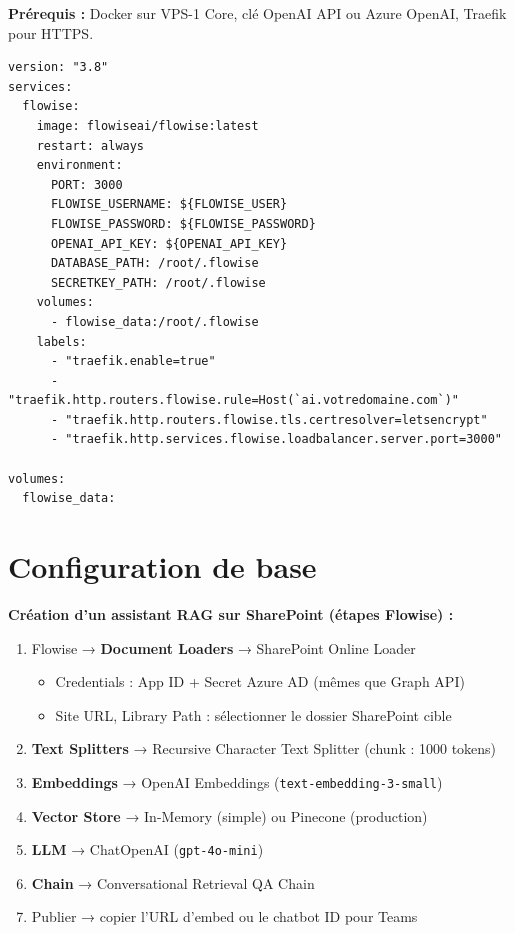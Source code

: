 \documentclass[11pt, a4paper]{article}
\begin{document}
\textbf{Prérequis :} Docker sur VPS-1 Core, clé OpenAI API ou Azure OpenAI, Traefik pour HTTPS.

\begin{lstlisting}[style=yamlstyle, caption={docker-compose.yml — Flowise}]
version: "3.8"
services:
  flowise:
    image: flowiseai/flowise:latest
    restart: always
    environment:
      PORT: 3000
      FLOWISE_USERNAME: ${FLOWISE_USER}
      FLOWISE_PASSWORD: ${FLOWISE_PASSWORD}
      OPENAI_API_KEY: ${OPENAI_API_KEY}
      DATABASE_PATH: /root/.flowise
      SECRETKEY_PATH: /root/.flowise
    volumes:
      - flowise_data:/root/.flowise
    labels:
      - "traefik.enable=true"
      - "traefik.http.routers.flowise.rule=Host(`ai.votredomaine.com`)"
      - "traefik.http.routers.flowise.tls.certresolver=letsencrypt"
      - "traefik.http.services.flowise.loadbalancer.server.port=3000"

volumes:
  flowise_data:
\end{lstlisting}

\section{Configuration de base}

\textbf{Création d'un assistant RAG sur SharePoint (étapes Flowise) :}
\begin{enumerate}
  \item Flowise → \textbf{Document Loaders} → SharePoint Online Loader
    \begin{itemize}
      \item Credentials : App ID + Secret Azure AD (mêmes que Graph API)
      \item Site URL, Library Path : sélectionner le dossier SharePoint cible
    \end{itemize}
  \item \textbf{Text Splitters} → Recursive Character Text Splitter (chunk : 1000 tokens)
  \item \textbf{Embeddings} → OpenAI Embeddings (\texttt{text-embedding-3-small})
  \item \textbf{Vector Store} → In-Memory (simple) ou Pinecone (production)
  \item \textbf{LLM} → ChatOpenAI (\texttt{gpt-4o-mini})
  \item \textbf{Chain} → Conversational Retrieval QA Chain
  \item Publier → copier l'URL d'embed ou le chatbot ID pour Teams
\end{enumerate}
\end{document}
